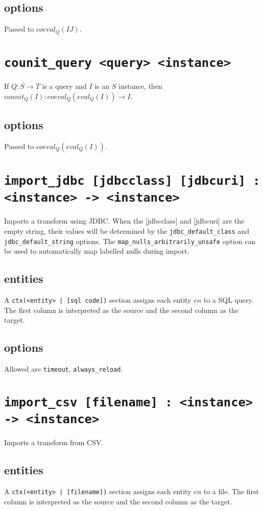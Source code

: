 \documentclass[10pt]{book}
\begin{document}
\subsection{options}
Passed to $coeval_Q(IJ)$.

\section{{\tt counit\_query <query> <instance>}}
If $Q : S \to T$ is a query and $I$ is an $S$ instance, then $counit_Q(I) : coeval_Q(eval_Q(I))  \to I$.
\subsection{options}
Passed to $coeval_Q(eval_Q(I))$.

\section{{\tt import\_jdbc  [jdbcclass] [jdbcuri] : <instance> -> <instance>}}
Imports a transform using JDBC. When the [jdbcclass] and [jdbcuri] are the empty string, their values will be determined by the {\tt jdbc\_default\_class} and {\tt jdbc\_default\_string} options.  The {\tt map\_nulls\_arbitrarily\_unsafe} option can be used to automatically map labelled nulls during import.

\subsection{entities}
A {\tt ctx(<entity> | [sql code])} section assigns each entity $en$ to a SQL query.  The first column is interpreted as the source and the second column as the target.

\subsection{options}
Allowed are {\tt timeout}, {\tt always\_reload}.  

\section{{\tt import\_csv [filename] : <instance> -> <instance>}} 

Imports a transform from CSV.  

\subsection{entities}
A {\tt ctx(<entity> | [filename])} section assigns each entity $en$ to a file.  The first column is interpreted as the source and the second column as the target.
\end{document}
